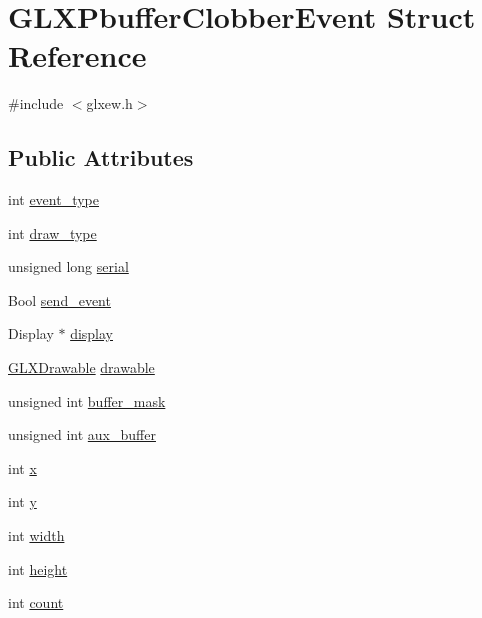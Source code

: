 \hypertarget{struct_g_l_x_pbuffer_clobber_event}{}\section{G\+L\+X\+Pbuffer\+Clobber\+Event Struct Reference}
\label{struct_g_l_x_pbuffer_clobber_event}


{\ttfamily \#include $<$glxew.\+h$>$}

\subsection*{Public Attributes}
\begin{DoxyCompactItemize}
\item 
int \mbox{\hyperlink{struct_g_l_x_pbuffer_clobber_event_a30d7162d8d77246b01f5e610cda4da68}{event\+\_\+type}}
\item 
int \mbox{\hyperlink{struct_g_l_x_pbuffer_clobber_event_a243f92b79d3cfbde73eab02815be2320}{draw\+\_\+type}}
\item 
unsigned long \mbox{\hyperlink{struct_g_l_x_pbuffer_clobber_event_a6390b2875ae06a4cb827d2b4c321eda3}{serial}}
\item 
Bool \mbox{\hyperlink{struct_g_l_x_pbuffer_clobber_event_aa51969e67e4ad6095bda26ca64fe8ba6}{send\+\_\+event}}
\item 
Display $\ast$ \mbox{\hyperlink{struct_g_l_x_pbuffer_clobber_event_aeb49bb93cc59448e75d66170a39596d1}{display}}
\item 
\mbox{\hyperlink{glxew_8h_a826f51745d9d6c81bdbac47ae2b80cf7}{G\+L\+X\+Drawable}} \mbox{\hyperlink{struct_g_l_x_pbuffer_clobber_event_a388908b766e35205c1a461ea8b60439f}{drawable}}
\item 
unsigned int \mbox{\hyperlink{struct_g_l_x_pbuffer_clobber_event_aff4c23d00f6dad98427f8d32a5f10580}{buffer\+\_\+mask}}
\item 
unsigned int \mbox{\hyperlink{struct_g_l_x_pbuffer_clobber_event_a13193b6e7e3e52b15f754fe91403b7ec}{aux\+\_\+buffer}}
\item 
int \mbox{\hyperlink{struct_g_l_x_pbuffer_clobber_event_a8f0a7162a033c89ee94ce535580dbc32}{x}}
\item 
int \mbox{\hyperlink{struct_g_l_x_pbuffer_clobber_event_a69eb7ac60d36ac3ec4550ac206cfc61f}{y}}
\item 
int \mbox{\hyperlink{struct_g_l_x_pbuffer_clobber_event_aaca375fecb872c73c60cd5d0bfc7c7a5}{width}}
\item 
int \mbox{\hyperlink{struct_g_l_x_pbuffer_clobber_event_aed4e539c896bdad15217bf92c28f8520}{height}}
\item 
int \mbox{\hyperlink{struct_g_l_x_pbuffer_clobber_event_a61e9f6b31738464dca67f909fcacd298}{count}}
\end{DoxyCompactItemize}


